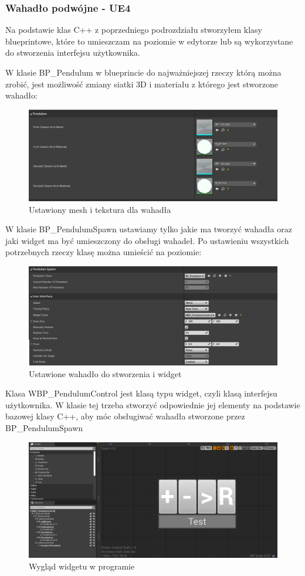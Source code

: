 \documentclass[a4paper,12pt,reqno]{article}
\begin{document}
\subsubsection{Wahadło podwójne - UE4}
{\color{red}
Na podstawie klas C++ z poprzedniego podrozdziału stworzyłem klasy blueprintowe, które to umieszczam na poziomie w edytorze lub są wykorzystane do stworzenia interfejsu użytkownika.


W klasie BP\_Pendulum w blueprincie do najważniejszej rzeczy którą można zrobić, jest możliwość zmiany siatki 3D i materiału z którego jest stworzone wahadło:

\begin{figure}[H]%
\centering
\includegraphics[width=0.7\columnwidth]{graphics/pendulum/PendulumBP.png}
\caption{Ustawiony mesh i tekstura dla wahadła 
\label{BPExample}}%
%
\qquad
\end{figure}  

W klasie BP\_PendulumSpawn ustawiamy tylko jakie ma tworzyć wahadła oraz jaki widget ma być umieszczony do obsługi wahadeł. Po ustawieniu wszystkich potrzebnych rzeczy klasę można umieścić na poziomie:

\begin{figure}[H]%
\centering
\includegraphics[width=0.7\columnwidth]{graphics/pendulum/PendulumSpawnerBP.png}
\caption{Ustawione wahadło do stworzenia i widget 
\label{BPExample}}%
%
\qquad
\end{figure}  

 
Klasa WBP\_PendulumControl jest klasą typu widget, czyli klasą interfejsu użytkownika. W klasie tej trzeba stworzyć odpowiednie jej elementy na podstawie bazowej klasy C++, aby móc obsługiwać wahadła stworzone przez BP\_PendulumSpawn
}

\begin{figure}[H]%
\centering
\includegraphics[width=0.7\columnwidth]{graphics/pendulum/PendulumControlBP.png}
\caption{Wygląd widgetu w programie
\label{BPExample}}%
%
\qquad
\end{figure}  
\end{document}

